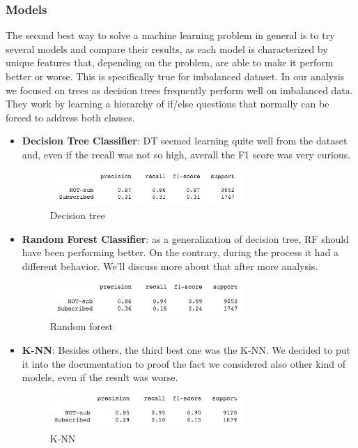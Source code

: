 \subsubsection{Models}
The second best way to solve a machine learning problem in general is to try several models and compare their results, as each model is characterized by unique features that, depending on the problem, are able to make it perform better or worse. This is specifically true for imbalanced dataset. In our analysis we focused on trees as decision trees frequently perform well on imbalanced data.
\\They work by learning a hierarchy of if/else questions that normally can be forced to address both classes.

\begin{itemize}
\item \textbf{Decision Tree Classifier}: DT seemed learning quite well from the dataset and, even if the recall was not so high, averall the F1 score was very curious.

\begin{figure}[H]
\centering
\includegraphics[width=0.7\textwidth]{Img/normal_tree.png}
\caption{Decision tree}
\end{figure}
\item \textbf{Random Forest Classifier}: as a generalization of decision tree, RF should have been performing better. On the contrary, during the process it had a different behavior. We'll discuss more about that after more analysis.

\begin{figure}[H]
\centering
\includegraphics[width=0.7\textwidth]{Img/normal_forest.png}
\caption{Random forest}
\end{figure}

\item \textbf{K-NN}: Besides others, the third best one was the K-NN. We decided to put it into the documentation to proof the fact we considered also other kind of models, even if the result was worse.

\begin{figure}[H]
\centering
\includegraphics[width=0.7\textwidth]{Img/normal_knn.png}
\caption{K-NN}
\end{figure}
\end{itemize}

